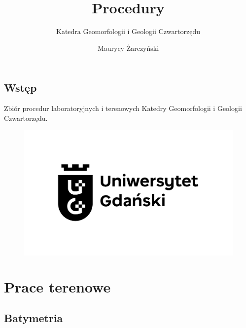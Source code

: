 \documentclass[
  letterpaper,
  DIV=11,
  numbers=noendperiod]{scrreprt}
\title{Procedury}
\subtitle{Katedra Geomorfologii i Geologii Czwartorzędu}
\author{Maurycy Żarczyński}
\date{}
\renewcommand*\contentsname{Table of contents}
\newcommand\contentsname{Table of contents}
\begin{document}
\maketitle
\ifdefined\Shaded\renewenvironment{Shaded}{\begin{tcolorbox}[boxrule=0pt, sharp corners, enhanced, breakable, borderline west={3pt}{0pt}{shadecolor}, frame hidden, interior hidden]}{\end{tcolorbox}}\fi

\renewcommand*\contentsname{Table of contents}
{
\hypersetup{linkcolor=}
\setcounter{tocdepth}{2}
\tableofcontents
}

\hypertarget{wstux119p}{%
\chapter*{Wstęp}\label{wstux119p}}


Zbiór procedur laboratoryjnych i terenowych Katedry Geomorfologii i
Geologii Czwartorzędu.

\begin{figure}

{\centering \includegraphics{images/Asset 1@8x.png}

}

\end{figure}

\part{Prace terenowe}

\hypertarget{batymetria}{%
\chapter{Batymetria}\label{batymetria}}
\end{document}
